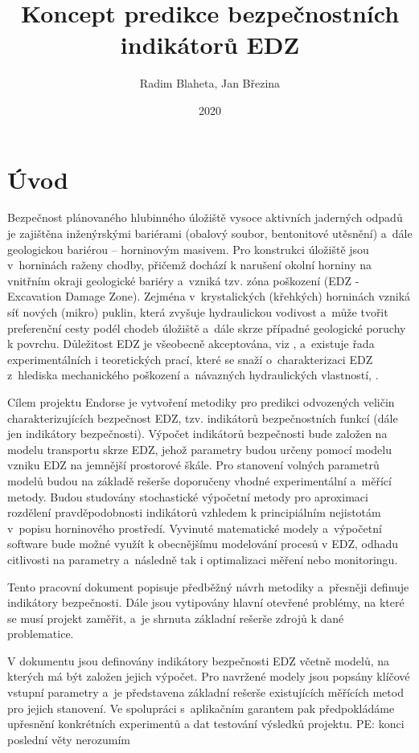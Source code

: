 \documentclass{article}
\title{Koncept predikce bezpečnostních indikátorů EDZ}
\author{Radim Blaheta, Jan Březina}
\date{2020}
\newcommand{\pe}[1]{{\color{orange} PE: #1}}
\begin{document}
\maketitle


\section{Úvod}
Bezpečnost plánovaného hlubinného úložiště vysoce aktivních jaderných odpadů je zajištěna 
inženýrskými bariérami (obalový soubor, bentonitové utěsnění) a~dále geologickou bariérou 
– horninovým masivem. Pro konstrukci úložiště jsou v~horninách raženy chodby, přičemž dochází 
k narušení okolní horniny na vnitřním okraji geologické bariéry a~vzniká tzv. zóna poškození 
(EDZ - Excavation Damage Zone). 
Zejména v~krystalických (křehkých) horninách vzniká síť nových (mikro) puklin, která zvyšuje 
hydraulickou vodivost a~může tvořit preferenční cesty podél 
chodeb úložiště a~dále skrze případné geologické poruchy k povrchu.
Důležitost EDZ je všeobecně
akceptována, viz \cite{Pusch2008}, a~existuje řada experimentálních i teoretických prací, které se snaží o~charakterizaci EDZ z~hlediska mechanického poškození a~návazných hydraulických vlastností, \cite{Vavro2016}.

Cílem projektu Endorse je vytvoření metodiky pro predikci odvozených veličin charakterizujících 
bezpečnost EDZ, tzv. indikátorů bezpečnostních funkcí (dále jen indikátory bezpečnosti).
Výpočet indikátorů bezpečnosti bude založen na modelu transportu skrze EDZ, 
jehož parametry budou určeny pomocí modelu vzniku EDZ na jemnější prostorové škále. 
Pro stanovení volných parametrů modelů budou na základě rešerše doporučeny vhodné experimentální a~měřící metody.
Budou studovány stochastické výpočetní metody pro aproximaci rozdělení pravděpodobnosti indikátorů
vzhledem k principiálním nejistotám v~popisu horninového prostředí.
Vyvinuté matematické modely a~výpočetní software bude možné využít k obecnějšímu modelování procesů 
v EDZ, odhadu citlivosti na parametry a~následně tak i optimalizaci měření nebo monitoringu.



Tento pracovní dokument popisuje předběžný návrh metodiky a~přesněji definuje indikátory 
bezpečnosti. Dále jsou vytipovány hlavní otevřené problémy, na které se musí projekt zaměřit, a~je 
shrnuta základní rešerše zdrojů k dané problematice. 




V dokumentu jsou definovány indikátory bezpečnosti EDZ včetně modelů, na kterých 
má být založen jejich výpočet. Pro navržené modely jsou popsány klíčové vstupní 
parametry a~je představena základní rešerše existujících měřících metod pro jejich
stanovení. Ve spolupráci s~aplikačním garantem pak předpokládáme upřesnění konkrétních experimentů
a dat testování výsledků projektu. \pe{konci poslední věty nerozumím}
\end{document}
